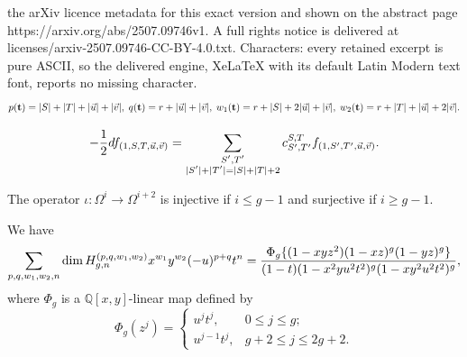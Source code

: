 \documentclass[10pt,a4paper]{amsart}
\DeclarePairedDelimiter{\abs}{\lvert}{\rvert}
\DeclarePairedDelimiter{\set}{\{}{\}}
\newcommand\Q{{\mathbb Q}}
\begin{document}
the arXiv licence metadata for this exact version and shown on the abstract page https://arxiv.org/abs/2507.09746v1. A full rights notice is delivered at licenses/arxiv-2507.09746-CC-BY-4.0.txt. Characters: every retained excerpt is pure ASCII, so the delivered engine, XeLaTeX with its default Latin Modern text font, reports no missing character.
\begin{equation}\label{eq:grading}
    p(\mathbf{t})=\abs{S}+\abs{T}+\abs{\vec u}+\abs{\vec v}, \; q(\mathbf{t})=r+\abs{\vec u}+\abs{\vec v}, \; w_1(\mathbf{t})=r+\abs{S}+2\abs{\vec u}+\abs{\vec v}, \; w_2(\mathbf{t})=r+\abs{T}+\abs{\vec u}+2\abs{\vec v}.
\end{equation}

\begin{equation} \label{eq:TheC's}
    -\frac12 df_{(1,S,T,\vec u,\vec v)}=\sum_{\substack{S',T'\\\abs{S'}+\abs{T'}=\abs{S}+\abs{T}+2}} c^{S,T}_{S',T'}f_{(1,S',T',\vec u,\vec v)}.
\end{equation}

\begin{lemma}
    The operator $\iota:\Omega^i\to \Omega^{i+2}$ is injective if $i\leq g-1$ and surjective if $i\geq g-1$. 
    \label{lem:hard-lefschetz}
\end{lemma}

\begin{proposition}
    We have
    \begin{equation}\label{eq:hilbert-hgn}
        \sum_{p,q,w_1,w_2,n} \dim H_{g,n}^{(p,q,w_1,w_2)} x^{w_1}y^{w_2}(-u)^{p+q}t^n =\frac{\Phi_g\set{(1-xyz^2)(1-xz)^g(1-yz)^g}}{(1-t)(1-x^2 yu^2t^2)^g(1-xy^2u^2t^2)^g},
    \end{equation}
    where $\Phi_g$ is a $\Q[x,y]$-linear map defined by 
    \begin{equation}\label{eq:shiftDef}
    \Phi_g(z^j)=\begin{cases}
    u^j t^j,& 0\leq j\leq g;\\
    u^{j-1}t^j,& g+2\leq j\leq 2g+2.
    \end{cases}
    \end{equation}
\end{proposition}
\end{document}
